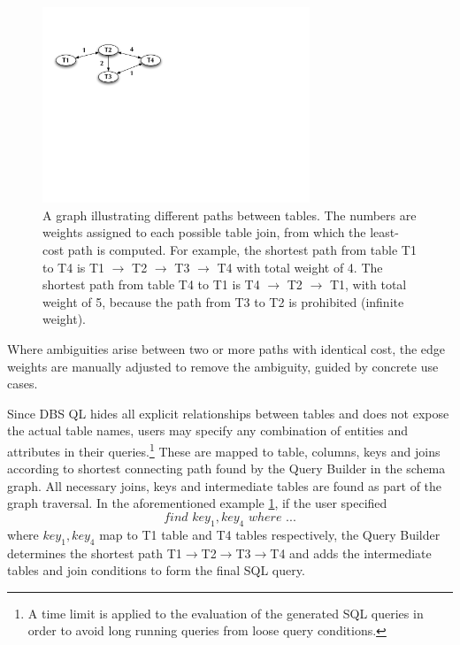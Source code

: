 \documentclass[a4paper]{jpconf}
\begin{document}
\begin{figure}[htb]
\centering
\includegraphics[width=80mm]{DBSSql_shortestpath.pdf}
\caption{A graph illustrating different paths between tables. The
numbers are weights assigned to each possible table join, from which the least-cost path
is computed. For example, the shortest path from table T1 to T4 is 
T1 $\rightarrow$ T2 $\rightarrow$ T3 $\rightarrow$ T4 with total weight 
of 4.  The shortest path from table T4 to T1 is 
T4 $\rightarrow$ T2 $\rightarrow$ T1, with total weight of 5, because the path
from T3 to T2 is prohibited (infinite weight).
}
\label{ShortestPath}
\end{figure}
Where ambiguities arise between two or more paths
with identical cost, the edge weights are manually adjusted to remove the
ambiguity, guided by concrete use cases. 

Since DBS QL hides all explicit relationships between tables and does not
expose the actual table names, users may
specify any combination of entities and attributes in their queries.\footnote{
A time limit is applied to the evaluation of the generated SQL queries
in order to avoid long running queries from loose query conditions.}
These are mapped to table, columns, keys and joins according to
shortest connecting path found by the Query Builder in the schema graph.
All necessary joins, keys and intermediate tables are found as part of the
graph traversal.
In the aforementioned example \ref{ShortestPath},
if the user specified
$$find\,\, key_1, key_4\,\, where\,\, ...$$
where $key_1, key_4$ map to T1 table and T4 tables respectively,
the Query Builder determines
the shortest path 
T1$\rightarrow$T2$\rightarrow$T3$\rightarrow$T4 
and adds the intermediate tables 
and join conditions to form the final SQL query. 
\end{document}
